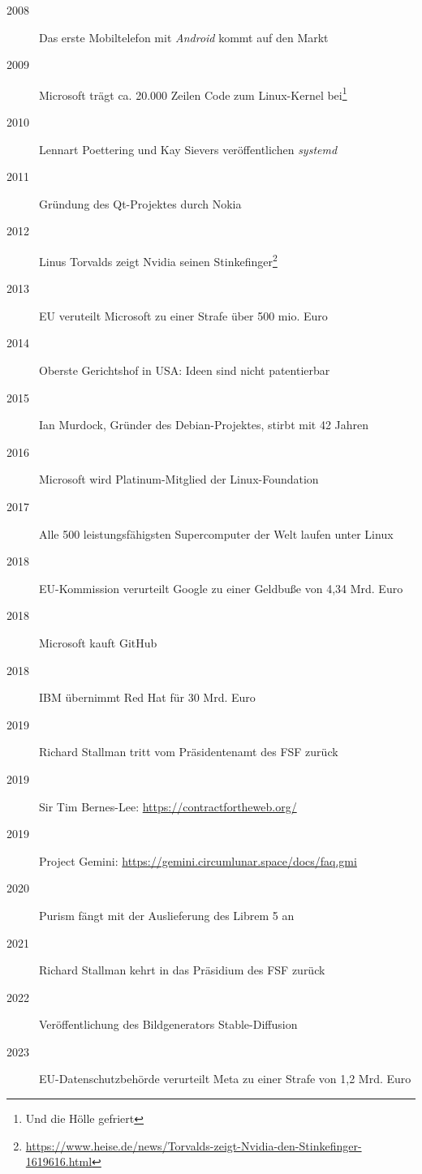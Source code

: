 \documentclass[titlepage,a4paper]{article}
\begin{document}
\begin{description}
\item[2008] Das erste Mobiltelefon mit \emph{Android} kommt auf den Markt
\item[2009] Microsoft trägt ca. 20.000 Zeilen Code zum Linux-Kernel bei\footnote{Und die Hölle gefriert}
\item[2010] Lennart Poettering und Kay Sievers veröffentlichen \emph{systemd}
\item[2011] Gründung des Qt-Projektes durch Nokia
\item[2012] Linus Torvalds zeigt Nvidia seinen Stinkefinger\footnote{\url{https://www.heise.de/news/Torvalds-zeigt-Nvidia-den-Stinkefinger-1619616.html}}
\item[2013] EU veruteilt Microsoft zu einer Strafe über 500 mio. Euro
\item[2014] Oberste Gerichtshof in USA: Ideen sind nicht patentierbar
\item[2015] Ian Murdock, Gründer des Debian-Projektes, stirbt mit 42 Jahren
\item[2016] Microsoft wird Platinum-Mitglied der Linux-Foundation
\item[2017] Alle 500 leistungsfähigsten Supercomputer der Welt laufen unter Linux
\item[2018] EU-Kommission verurteilt Google zu einer Geldbuße von 4,34 Mrd. Euro
\item[2018] Microsoft kauft GitHub
\item[2018] IBM übernimmt Red Hat für 30 Mrd. Euro
\item[2019] Richard Stallman tritt vom Präsidentenamt des FSF zurück
\item[2019] Sir Tim Bernes-Lee: \url{https://contractfortheweb.org/}
\item[2019] Project Gemini: \url{https://gemini.circumlunar.space/docs/faq.gmi}
\item[2020] Purism fängt mit der Auslieferung des Librem 5 an
\item[2021] Richard Stallman kehrt in das Präsidium des FSF zurück
\item[2022] Veröffentlichung des Bildgenerators Stable-Diffusion
\item[2023] EU-Datenschutzbehörde verurteilt Meta zu einer Strafe von 1,2 Mrd. Euro
\end{description}
\newpage
\end{document}

